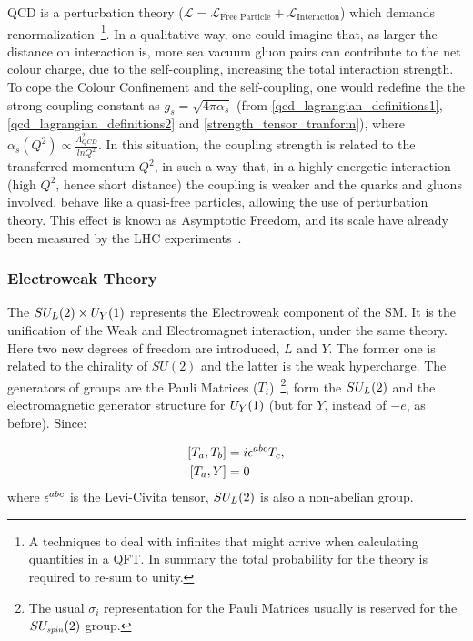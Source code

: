 QCD is a perturbation theory ($\mathcal{L} = \mathcal{L}_{\text{Free Particle}} + \mathcal{L}_{\text{Interaction}}$) which demands renormalization~\footnote{A techniques to deal with infinites that might arrive when calculating quantities in a QFT. In summary the total probability for the theory is required to re-sum to unity.}. In a qualitative way, one could imagine that, as larger the distance on interaction is, more sea vacuum gluon pairs can contribute to the net colour charge, due to the self-coupling, increasing the total interaction strength. To cope the Colour Confinement and the self-coupling, one would redefine the the strong coupling constant as $g_s = \sqrt{4 \pi \alpha_s}$ (from \ref{qcd_lagrangian_definitions1}, \ref{qcd_lagrangian_definitions2} and \ref{strength_tensor_tranform}), where $\alpha_s(Q^2) \propto \frac{\Lambda^2_{QCD}}{ln Q^2}$. In this situation, the coupling strength is related to the transferred momentum $Q^2$, in such a way that, in a highly energetic interaction (high $Q^2$, hence short distance) the coupling is weaker and the quarks and gluons involved, behave like a quasi-free particles, allowing the use of perturbation theory. This effect is known as Asymptotic Freedom, and its scale have already been measured by the LHC experiments~\cite{pdg_2020}.

\subsubsection{Electroweak Theory}

The $SU_{\scaleto{L}{5pt}}(2) \times U_{\scaleto{Y}{5pt}}(1)$ represents the Electroweak component of the SM. It is the unification of the Weak and Electromagnet interaction, under the same theory. Here two new degrees of freedom are introduced, $L$ and $Y$. The former one is related to the chirality of $SU(2)$ and the latter is the weak hypercharge. The generators of groups are the Pauli Matrices ($T_i$)~\footnote{The usual $\sigma_i$ representation for the Pauli Matrices usually is reserved for the $SU_{\scaleto{spin}{5pt}}(2)$ group.}, form the $SU_{\scaleto{L}{5pt}}(2)$ and the electromagnetic generator structure for $U_{\scaleto{Y}{5pt}}(1)$ (but for $Y$, instead of $-e$, as before). Since:

\begin{equation}
    \begin{split}
        \left[ T_a, T_b \right] &=  i \levicivita{^{abc}}T_c,  \\
        \left[ T_a, Y \right] &=  0
    \end{split}
\label{pauli_commutator}
\end{equation}
where $\levicivita{^{abc}}$ is the Levi-Civita tensor, $SU_{\scaleto{L}{5pt}}(2)$ is also a non-abelian group.

